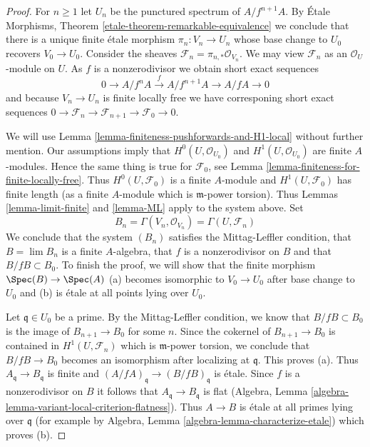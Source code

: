 \begin{proof}
For $n \geq 1$ let $U_n$ be the punctured spectrum of $A/f^{n + 1}A$.
By \'Etale Morphisms, Theorem \ref{etale-theorem-remarkable-equivalence}
we conclude that there is a unique finite \'etale morphism
$\pi_n : V_n \to U_n$ whose base change to $U_0$ recovers $V_0 \to U_0$.
Consider the sheaves $\mathcal{F}_n = \pi_{n, *}\mathcal{O}_{V_n}$.
We may view $\mathcal{F}_n$ as an $\mathcal{O}_U$-module on $U$.
As $f$ is a nonzerodivisor we obtain short exact sequences
$$
0 \to A/f^nA \xrightarrow{f} A/f^{n + 1}A \to A/fA \to 0
$$
and because $V_n \to U_n$ is finite locally free we have corresponing
short exact sequences
$0 \to \mathcal{F}_n \to \mathcal{F}_{n + 1} \to \mathcal{F}_0 \to 0$.

\medskip\noindent
We will use Lemma \ref{lemma-finiteness-pushforwards-and-H1-local}
without further mention.
Our assumptions imply that $H^0(U, \mathcal{O}_{U_0})$ and
$H^1(U, \mathcal{O}_{U_0})$ are finite $A$-modules.
Hence the same thing is true for $\mathcal{F}_0$, see
Lemma \ref{lemma-finiteness-for-finite-locally-free}.
Thus $H^0(U, \mathcal{F}_0)$ is a finite $A$-module
and $H^1(U, \mathcal{F}_0)$ has finite length
(as a finite $A$-module which is $\mathfrak m$-power torsion).
Thus Lemmas \ref{lemma-limit-finite} and \ref{lemma-ML} apply
to the system above. Set
$$
B_n = \Gamma(V_n, \mathcal{O}_{V_n}) = \Gamma(U, \mathcal{F}_n)
$$
We conclude that the system $(B_n)$ satisfies the Mittag-Leffler condition,
that $B = \lim B_n$ is a finite $A$-algebra, that $f$ is a nonzerodivisor
on $B$ and that $B/fB \subset B_0$. To finish the proof,
we will show that the finite morphism
$\Spec(B) \to \Spec(A)$ (a) becomes isomorphic to $V_0 \to U_0$
after base change to $U_0$ and (b) is \'etale at all points lying
over $U_0$.

\medskip\noindent
Let $\mathfrak q \in U_0$ be a prime. By the Mittag-Leffler
condition, we know that $B/fB \subset B_0$ is the image of
$B_{n + 1} \to B_0$ for some $n$. Since the cokernel of $B_{n + 1} \to B_0$
is contained in $H^1(U, \mathcal{F}_n)$ which is $\mathfrak m$-power
torsion, we conclude that $B/fB \to B_0$ becomes an isomorphism
after localizing at $\mathfrak q$. This proves (a).
Thus $A_\mathfrak q \to B_\mathfrak q$
is finite and $(A/fA)_\mathfrak q \to (B/fB)_\mathfrak q$ is \'etale.
Since $f$ is a nonzerodivisor on $B$ it follows that
$A_\mathfrak q \to B_\mathfrak q$ is flat
(Algebra, Lemma \ref{algebra-lemma-variant-local-criterion-flatness}).
Thus $A \to B$ is \'etale at all primes lying over $\mathfrak q$
(for example by Algebra, Lemma \ref{algebra-lemma-characterize-etale})
which proves (b).
\end{proof}

